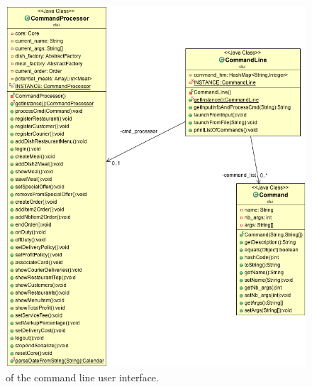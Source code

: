 \begin{figure}[H]
  \begin{center}
    \includegraphics[scale=0.41]{./img/CLUI.png}
    \end{center}
  \caption{\umld of the command line user interface.}
  \label{fig:clui_uml}
\end{figure}


